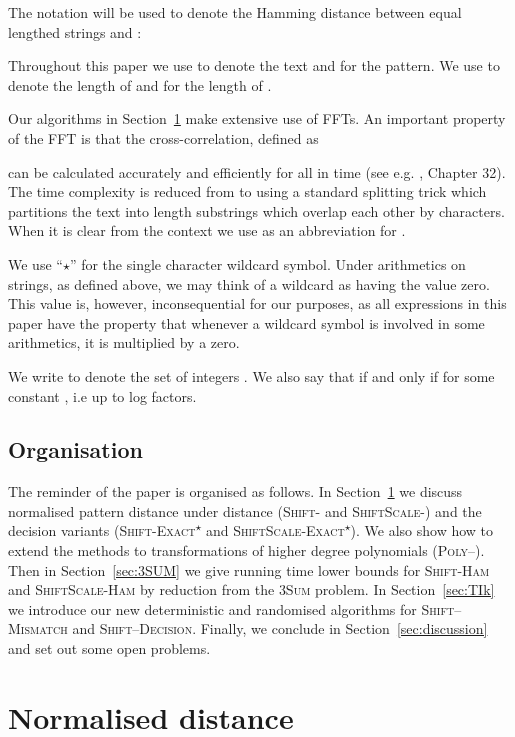 \documentclass[11pt]{article}
\newcommand{\wildcard}{\ensuremath{\star}\xspace}
\newcommand{\sExactWild}{\textsc{Shift-Exact\textsuperscript{\wildcard}}\xspace}
\newcommand{\ssExactWild}{\textsc{ShiftScale-Exact\textsuperscript{\wildcard}}\xspace}
\newcommand{\sLtwoWild}{\textsc{Shift-}\xspace}
\newcommand{\ssLtwoWild}{\textsc{ShiftScale-}\xspace}
\newcommand{\LpolyWild}{\textsc{Poly--}\xspace}
\newcommand{\sHam}{\textsc{Shift-Ham}\xspace}
\newcommand{\ssHam}{\textsc{ShiftScale-Ham}\xspace}
\newcommand{\skMismatch}{\textsc{Shift--Mismatch}\xspace}
\newcommand{\skDecision}{\textsc{Shift--Decision}\xspace}
\newcommand{\threeSUM}{\textsc{3Sum}\xspace}
\theoremstyle{plain}
\theoremstyle{definition}
\begin{document}
The notation  will be used to denote the Hamming distance between equal lengthed strings  and :


Throughout this paper we use  to denote the text and  for the pattern. We use  to denote the length of  and  for the length of .

Our algorithms in Section~\ref{sec:TIL2} make extensive use of FFTs.  An important property of the FFT is that the cross-correlation, defined as

can be calculated accurately and efficiently for all  in  time (see e.g. \cite{Cormen:1990}, Chapter 32). The time complexity is reduced from  to  using a standard splitting trick which partitions the text into  length substrings which overlap each other by  characters. When it is clear from the context we use  as an abbreviation for .

We use ``\wildcard'' for the single character wildcard symbol. Under arithmetics on strings, as defined above, we may think of a wildcard as having the value zero. This value is, however, inconsequential for our purposes, as all expressions in this paper have the property that whenever a wildcard symbol is involved in some arithmetics, it is multiplied by a zero.

We write  to denote the set of integers . We also say that  if and only if  for some constant , i.e  up to log factors.


\subsection{Organisation}

The reminder of the paper is organised as follows. In Section~\ref{sec:TIL2} we discuss normalised pattern distance under  distance (\sLtwoWild and \ssLtwoWild) and the decision variants (\sExactWild and \ssExactWild). We also show how to extend the methods to transformations of higher degree polynomials (\LpolyWild). Then in Section~\ref{sec:3SUM} we give running time lower bounds for \sHam and \ssHam by reduction from the \threeSUM problem.  In Section~\ref{sec:TIk} we introduce our new deterministic and randomised algorithms for \skMismatch and \skDecision. Finally, we conclude in Section~\ref{sec:discussion} and set out some open problems.


\section{Normalised  distance}\label{sec:TIL2}
\end{document}
